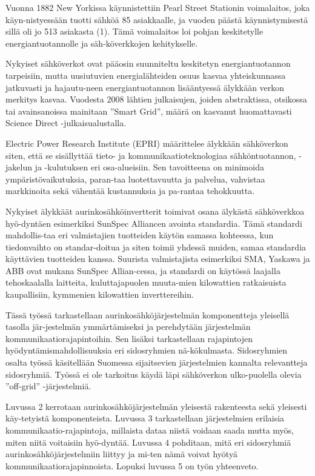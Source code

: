 Vuonna 1882 New Yorkissa käynnistettiin Pearl Street Stationin voimalaitos, joka käyn-nistyessään tuotti sähköä 85 asiakkaalle, ja vuoden päästä käynnistymisestä sillä oli jo 513 asiakasta (1). Tämä voimalaitos loi pohjan keskitetylle energiantuotannolle ja säh-köverkkojen kehitykselle. 

Nykyiset sähköverkot ovat pääosin suunniteltu keskitetyn energiantuotannon tarpeisiin, mutta uusiutuvien energialähteiden osuus kasvaa yhteiskunnassa jatkuvasti ja hajautu-neen energiantuotannon lisääntyessä älykkään verkon merkitys kasvaa. Vuodesta 2008 lähtien julkaisujen, joiden abstraktissa, otsikossa tai avainsanoissa mainitaan ”Smart Grid”, määrä on kasvanut huomattavasti Science Direct -julkaisualustalla.

Electric Power Research Institute (EPRI) määrittelee älykkään sähköverkon siten, että se sisällyttää tieto- ja kommunikaatioteknologiaa sähköntuotannon, -jakelun ja -kulutuksen eri osa-alueisiin. Sen tavoitteena on minimoida ympäristövaikutuksia, paran-taa luotettavuutta ja palvelua, vahvistaa markkinoita sekä vähentää kustannuksia ja pa-rantaa tehokkuutta. 

Nykyiset älykkäät aurinkosähköinvertterit toimivat osana älykästä sähköverkkoa hyö-dyntäen esimerkiksi SunSpec Alliancen avointa standardia. Tämä standardi mahdollis-taa eri valmistajien tuotteiden käytön samassa kohteessa, kun tiedonvaihto on standar-doitua ja siten toimii yhdessä muiden, samaa standardia käyttävien tuotteiden kanssa. Suurista valmistajista esimerkiksi SMA, Yaskawa ja ABB ovat mukana SunSpec Allian-cessa, ja standardi on käytössä laajalla tehoskaalalla laitteita, kuluttajapuolen muuta-mien kilowattien ratkaisuista kaupallisiin, kymmenien kilowattien inverttereihin.

Tässä työssä tarkastellaan aurinkosähköjärjestelmän komponentteja yleisellä tasolla jär-jestelmän ymmärtämiseksi ja perehdytään järjestelmän kommunikaatiorajapintoihin. Sen lisäksi tarkastellaan rajapintojen hyödyntämismahdollisuuksia eri sidosryhmien nä-kökulmasta. Sidosryhmien osalta työssä käsitellään Suomessa sijaitsevien järjestelmien kannalta relevantteja sidosryhmiä. Työssä ei ole tarkoitus käydä läpi sähköverkon ulko-puolella olevia ”off-grid” -järjestelmiä.

Luvussa 2 kerrotaan aurinkosähköjärjestelmän yleisestä rakenteesta sekä yleisesti käy-tetyistä komponenteista. Luvussa 3 tarkastellaan järjestelmien erilaisia kommunikaatio-rajapintoja, millaista dataa niistä voidaan saada mutta myös, miten niitä voitaisiin hyö-dyntää. Luvussa 4 pohditaan, mitä eri sidosryhmiä aurinkosähköjärjestelmiin liittyy ja mi-ten nämä voivat hyötyä kommunikaatiorajapinnoista. Lopuksi luvussa 5 on työn yhteenveto.